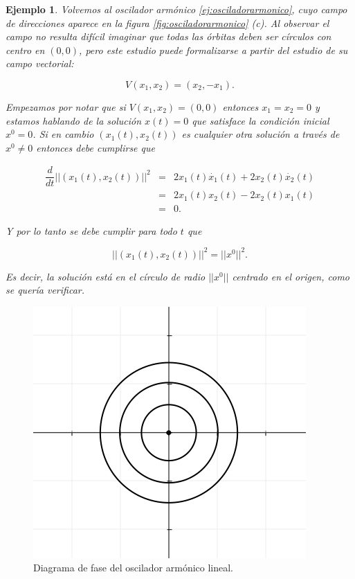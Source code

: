 \documentclass[11pt]{book}
\theoremstyle{definition}
\numberwithin{definition}{section}
\theoremstyle{theorem}
\numberwithin{theorem}{section}
\numberwithin{lemma}{section}
\numberwithin{corollary}{section}
\theoremstyle{plain}
\newtheorem{example}{Ejemplo}
\numberwithin{example}{section}
\begin{document}
\begin{example} \label{ej:sistemahiperbolas}
Volvemos al oscilador armónico \ref{ej:osciladorarmonico}, cuyo campo de direcciones aparece en la figura \ref{fig:osciladorarmonico} (c).
Al observar el campo no resulta difícil imaginar que todas las órbitas deben ser círculos con centro en $(0,0)$, pero este estudio puede formalizarse a partir del estudio de su campo vectorial:

$$ V(x_1,x_2) = (x_2, -x_1). $$

Empezamos por notar que si $V(x_1,x_2) = (0,0)$ entonces $x_1 = x_2 = 0$ y estamos hablando de la solución $x(t) = 0$ que satisface la condición inicial $x^0 = 0$. Si en cambio $(x_1(t),x_2(t))$ es cualquier otra solución a través de $x^0 \neq 0$ entonces debe cumplirse que 

$$
\begin{array}{ccl}
	\dfrac{d}{dt} || (x_1(t),x_2(t))  ||^2 & = & 2x_1(t)\dot{x_1}(t) + 2x_2(t)\dot{x_2}(t) \\
									   & = & 2x_1(t)x_2(t) - 2x_2(t)x_1(t) \\
									   & = & 0.
\end{array}
$$

Y por lo tanto se debe cumplir para todo $t$ que

$$ ||(x_1(t), x_2(t))||^2 = ||x^0||^2. $$

Es decir, la solución está en el círculo de radio $||x^0||$ centrado en el origen, como se quería verificar.
\end{example}

\begin{figure}[h] \centering
    \includegraphics[scale=0.5]{figures/osciladorarmonico-diagramafase.png}
    \caption{Diagrama de fase del oscilador armónico lineal.}
\end{figure}
\end{document}
